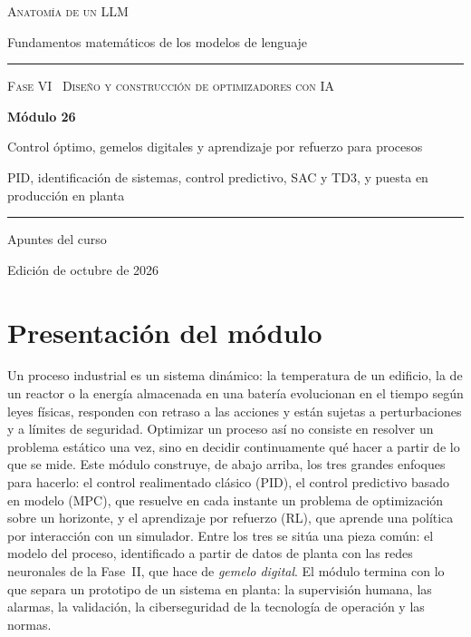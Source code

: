 \documentclass[11pt,a4paper,twoside,openany]{book}
\begin{document}
\frontmatter
\begin{titlepage}
\centering
\vspace*{2.5cm}
{\large\scshape Anatomía de un LLM}\par
\vspace{0.4cm}
{\normalsize Fundamentos matemáticos de los modelos de lenguaje}\par
\vspace{2.2cm}
\rule{\textwidth}{0.8pt}\par\vspace{0.5cm}
{\small\scshape Fase VI \textperiodcentered\ Diseño y construcción de optimizadores con IA}\par\vspace{0.3cm}
{\Huge\bfseries Módulo 26\par}\vspace{0.3cm}
{\LARGE Control óptimo, gemelos digitales y aprendizaje por refuerzo para procesos\par}
\vspace{0.2cm}
{\large PID, identificación de sistemas, control predictivo, SAC y TD3, y puesta en producción en planta\par}
\vspace{0.5cm}\rule{\textwidth}{0.4pt}\par
\vspace{1.6cm}
{\large Apuntes del curso}\par
\vfill
{\small Edición de octubre de 2026}\par
\end{titlepage}

\chapter*{Presentación del módulo}

Un proceso industrial es un sistema dinámico: la temperatura de un edificio, la de un reactor o la energía almacenada en una batería evolucionan en el tiempo según leyes físicas, responden con retraso a las acciones y están sujetas a perturbaciones y a límites de seguridad. Optimizar un proceso así no consiste en resolver un problema estático una vez, sino en decidir continuamente qué hacer a partir de lo que se mide. Este módulo construye, de abajo arriba, los tres grandes enfoques para hacerlo: el control realimentado clásico (PID), el control predictivo basado en modelo (MPC), que resuelve en cada instante un problema de optimización sobre un horizonte, y el aprendizaje por refuerzo (RL), que aprende una política por interacción con un simulador. Entre los tres se sitúa una pieza común: el modelo del proceso, identificado a partir de datos de planta con las redes neuronales de la Fase~II, que hace de \emph{gemelo digital}. El módulo termina con lo que separa un prototipo de un sistema en planta: la supervisión humana, las alarmas, la validación, la ciberseguridad de la tecnología de operación y las normas.
\end{document}
